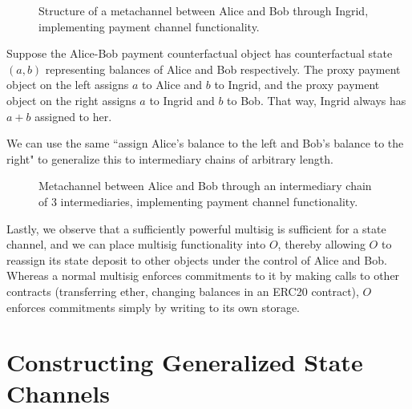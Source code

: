 \documentclass[prb,floatfix,reprint,nofootinbib,amsmath,amssymb,epsfig,pre,floats,letterpaper,groupedaffiliation,tightenlines,allcolors=blue,11pt]{revtex4}
\theoremstyle{definition}
\theoremstyle{definition}
\theoremstyle{definition}
\begin{document}
\begin{figure}[H]
    \centering
    
    \caption{Structure of a metachannel between Alice and Bob through Ingrid, implementing payment channel functionality.}
\end{figure}

Suppose the Alice-Bob payment counterfactual object has counterfactual state $(a, b)$ representing balances of Alice and Bob respectively. The proxy payment object on the left assigns $a$ to Alice and $b$ to Ingrid, and the proxy payment object on the right assigns $a$ to Ingrid and $b$ to Bob. That way, Ingrid always has $a + b$ assigned to her.

We can use the same ``assign Alice's balance to the left and Bob's balance to the right" to generalize this to intermediary chains of arbitrary length.

\begin{figure}[H]
    \centering
    
    \caption{Metachannel between Alice and Bob through an intermediary chain of 3 intermediaries, implementing payment channel functionality.}
\end{figure}

Lastly, we observe that a sufficiently powerful multisig is sufficient for a state channel, and we can place multisig functionality into $O$, thereby allowing $O$ to reassign its state deposit to other objects under the control of Alice and Bob. Whereas a normal multisig enforces commitments to it by making calls to other contracts (transferring ether, changing balances in an ERC20 contract), $O$ enforces commitments simply by writing to its own storage.

\section{Constructing Generalized State Channels}

\renewcommand{\|}{\ |\ }

\newcommand{\alice}{\textsf{Alice}}
\newcommand{\bob}{\textsf{Bob}}
\newcommand{\ingrid}{\textsf{Ingrid}}

\newcommand{\C}{\textsf{C}}

\newcommand{\multisig}{\textit{\textbf{\textsf{multisig}}}}
\newcommand{\registry}{\textit{\textbf{\textsf{registry}}}}
\newcommand{\multisigWS}{\textit{\textbf{\textsf{multisig }}}}
\newcommand{\registryWS}{\textit{\textbf{\textsf{registry }}}}

\newcommand{\cfaddr}{\textsf{cfaddr}}
\newcommand{\sign}{\textsf{sign}}
\newcommand{\code}{\textsf{code}}
\newcommand{\args}{\textsf{args}}
\newcommand{\nonce}{\textsf{nonce}}
\newcommand{\sfstate}{\textsf{state}}
\newcommand{\balance}{\textsf{balance}}
\newcommand{\id}{\textsf{id}}
\end{document}
